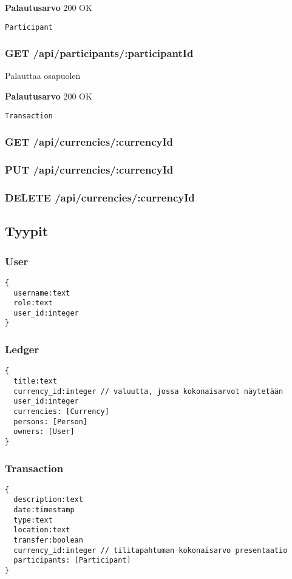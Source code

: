 \textbf{Palautusarvo}
200 OK
\begin{Verbatim}
Participant
\end{Verbatim}

\subsubsection{GET /api/participants/:participantId}

Palauttaa osapuolen

\textbf{Palautusarvo}
200 OK
\begin{Verbatim}
Transaction
\end{Verbatim}

\subsubsection{GET /api/currencies/:currencyId}

\subsubsection{PUT /api/currencies/:currencyId}

\subsubsection{DELETE /api/currencies/:currencyId}

\subsection{Tyypit}

\subsubsection{User}
\begin{Verbatim}
{
  username:text
  role:text
  user_id:integer
}
\end{Verbatim}

\subsubsection{Ledger}
\begin{Verbatim}
{
  title:text
  currency_id:integer // valuutta, jossa kokonaisarvot näytetään
  user_id:integer
  currencies: [Currency]
  persons: [Person]
  owners: [User]
}
\end{Verbatim}

\subsubsection{Transaction}
\begin{Verbatim}
{
  description:text
  date:timestamp
  type:text
  location:text
  transfer:boolean
  currency_id:integer // tilitapahtuman kokonaisarvo presentaatio
  participants: [Participant]
}
\end{Verbatim}

